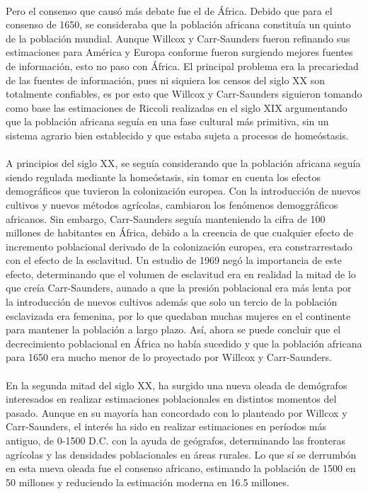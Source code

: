 \documentclass[11pt,spanish,letterpaper]{article}
\theoremstyle{plain}
\begin{document}
\\
Pero el consenso que caus\'o m\'as debate fue el de \'Africa. Debido que para el consenso de 1650, se consideraba que la poblaci\'on africana constitu\'ia un quinto de la poblaci\'on mundial. Aunque Willcox y Carr-Saunders fueron refinando sus estimaciones para Am\'erica y Europa conforme fueron surgiendo mejores fuentes de informaci\'on, esto no paso con \'Africa. El principal problema era la precariedad de las fuentes de informaci\'on, pues ni siquiera los censos del siglo XX son totalmente confiables, es por esto que Willcox y Carr-Saunders siguieron tomando como base las estimaciones de Riccoli realizadas en el siglo XIX argumentando que la poblaci\'on africana segu\'ia en una fase cultural m\'as primitiva, sin un sistema agrario bien establecido y que estaba sujeta a procesos de home\'ostasis.\\
\\
A principios del siglo XX, se segu\'ia considerando que la poblaci\'on africana segu\'ia siendo regulada mediante la home\'ostasis, sin tomar en cuenta los efectos demogr\'aficos que tuvieron la colonizaci\'on europea. Con la introducci\'on de nuevos cultivos y nuevos m\'etodos agr\'icolas, cambiaron los fen\'omenos demoggr\'aficos africanos. Sin embargo, Carr-Saunders segu\'ia manteniendo la cifra de 100 millones de habitantes en \'Africa, debido a la creencia de que cualquier efecto de incremento poblacional derivado de la colonizaci\'on europea, era constrarrestado con el efecto de la esclavitud. Un estudio de 1969 neg\'o la importancia de este efecto, determinando que el volumen de esclavitud era en realidad la mitad de lo que cre\'ia Carr-Saunders, aunado a que la presi\'on poblacional era m\'as lenta por la introducci\'on de nuevos cultivos adem\'as que solo un tercio de la poblaci\'on esclavizada era femenina, por lo que quedaban muchas mujeres en el continente para mantener la poblaci\'on a largo plazo. As\'i, ahora se puede concluir que el decrecimiento poblacional en \'Africa no hab\'ia sucedido y que la poblaci\'on africana para 1650 era mucho menor de lo proyectado por Willcox y Carr-Saunders.\\
\\
En la segunda mitad del siglo XX, ha surgido una nueva oleada de dem\'ografos interesados en realizar estimaciones poblacionales en distintos momentos del pasado. Aunque en su mayor\'ia han concordado con lo planteado por Willcox y Carr-Saunders, el inter\'es ha sido en realizar estimaciones en per\'iodos m\'as antiguo, de 0-1500 D.C. con la ayuda de ge\'ografos, determinando las fronteras agr\'icolas y las densidades poblacionales en \'areas rurales. Lo que s\'i se derrumb\'on en esta nueva oleada fue el consenso africano, estimando la poblaci\'on de 1500 en 50 millones y reduciendo la estimaci\'on moderna en 16.5 millones.\\
\end{document}
